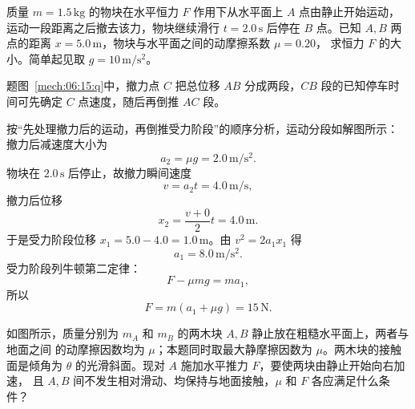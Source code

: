 {\begin{origexamplebox}{}\label{ch06:ex:s05-2-15}
质量 $m=1.5\,\mathrm{kg}$ 的物块在水平恒力 $F$ 作用下从水平面上 $A$ 点由静止开始运动，
运动一段距离之后撤去该力，物块继续滑行 $t=2.0\,\mathrm s$ 后停在 $B$ 点。已知
$A,B$ 两点的距离 $x=5.0\,\mathrm m$，物块与水平面之间的动摩擦系数 $\mu=0.20$，
求恒力 $F$ 的大小。简单起见取 $g=10\,\mathrm{m/s^2}$。

\begin{qualityfigure}
\label{mech:06:15:q}
\end{qualityfigure}
\end{origexamplebox}

\begin{xesolution}题图~\ref{mech:06:15:q}中，撤力点 $C$ 把总位移 $AB$ 分成两段，$CB$ 段的已知停车时间可先确定 $C$ 点速度，随后再倒推 $AC$ 段。

按“先处理撤力后的运动，再倒推受力阶段”的顺序分析，运动分段如解图所示：
\soldiagTwoFifteen
撤力后减速度大小为
\[
 a_2=\mu g=2.0\,\mathrm{m/s^2}.
\]
物块在 $2.0\,\mathrm s$ 后停止，故撤力瞬间速度
\[
 v=a_2t=4.0\,\mathrm{m/s},
\]
撤力后位移
\[
 x_2=\frac{v+0}{2}t=4.0\,\mathrm m.
\]
于是受力阶段位移 $x_1=5.0-4.0=1.0\,\mathrm m$。由 $v^2=2a_1x_1$ 得
\[
 a_1=8.0\,\mathrm{m/s^2}.
\]
受力阶段列牛顿第二定律：
\[
 F-\mu mg=ma_1,
\]
所以
\[
 \boxed{F=m(a_1+\mu g)=15\,\mathrm N}.
\]
\end{xesolution}

\begin{origexamplebox}{}\label{ch06:ex:s05-2-16}
如图所示，质量分别为 $m_A$ 和 $m_B$ 的两木块 $A,B$ 静止放在粗糙水平面上，两者与地面之间
的动摩擦因数均为 $\mu$；本题同时取最大静摩擦因数为 $\mu$。两木块的接触面是倾角为
$\theta$ 的光滑斜面。现对 $A$ 施加水平推力 $F$，要使两块由静止开始向右加速，
且 $A,B$ 间不发生相对滑动、均保持与地面接触，$\mu$ 和 $F$ 各应满足什么条件？
\probdiagTwoSixteen
\end{origexamplebox}

}
